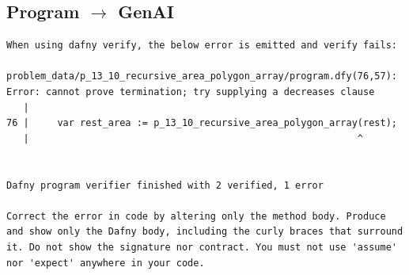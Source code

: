 \documentclass{article}
\begin{document}
\subsection*{Program $\rightarrow$ GenAI}
\begin{lstlisting}
When using dafny verify, the below error is emitted and verify fails:

problem_data/p_13_10_recursive_area_polygon_array/program.dfy(76,57): Error: cannot prove termination; try supplying a decreases clause
   |
76 |     var rest_area := p_13_10_recursive_area_polygon_array(rest);
   |                                                          ^


Dafny program verifier finished with 2 verified, 1 error

Correct the error in code by altering only the method body. Produce and show only the Dafny body, including the curly braces that surround it. Do not show the signature nor contract. You must not use 'assume' nor 'expect' anywhere in your code.
\end{lstlisting}
\end{document}
